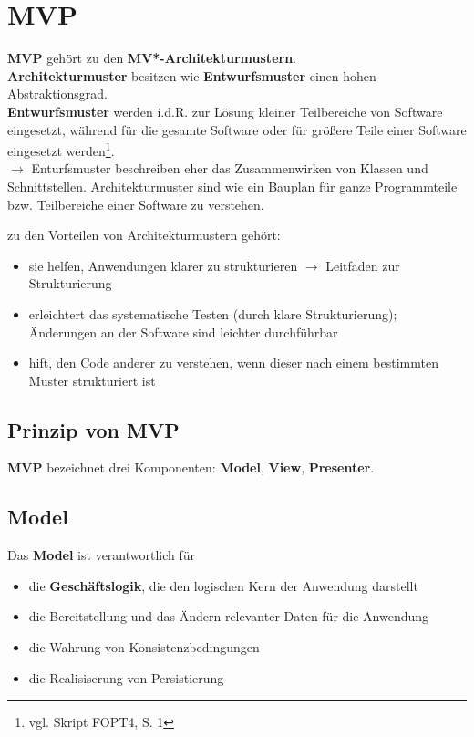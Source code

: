 \section{MVP}

\textbf{MVP} gehört zu den \textbf{MV*-Architekturmustern}.\\

\noindent
\textbf{Architekturmuster} besitzen wie \textbf{Entwurfsmuster} einen hohen Abstraktionsgrad.\\

\textbf{Entwurfsmuster} werden i.d.R. zur Lösung kleiner Teilbereiche von Software eingesetzt, während  für die gesamte Software oder für größere Teile einer Software eingesetzt werden\footnote{vgl. Skript FOPT4, S. 1}.\\
$\rightarrow$ Enturfsmuster beschreiben eher das Zusammenwirken von Klassen und Schnittstellen.
Architekturmuster sind wie ein Bauplan für ganze Programmteile bzw. Teilbereiche einer Software zu verstehen.

\noindent
zu den Vorteilen von Architekturmustern gehört:

\begin{itemize}
    \item sie helfen, Anwendungen klarer zu strukturieren $\rightarrow$ Leitfaden zur Strukturierung
    \item erleichtert das systematische Testen (durch klare Strukturierung); Änderungen an der Software sind leichter durchführbar
    \item hift, den Code anderer zu verstehen, wenn dieser nach einem bestimmten Muster strukturiert ist
\end{itemize}

\subsection{Prinzip von MVP}

\textbf{MVP} bezeichnet drei Komponenten: \textbf{Model}, \textbf{View}, \textbf{Presenter}.\\

\subsection*{Model}

Das \textbf{Model} ist verantwortlich für
\begin{itemize}
    \item die \textbf{Geschäftslogik}, die den logischen Kern der Anwendung darstellt
    \item die Bereitstellung und das Ändern relevanter Daten für die Anwendung
    \item die Wahrung von Konsistenzbedingungen
    \item die Realisiserung von Persistierung
\end{itemize}

